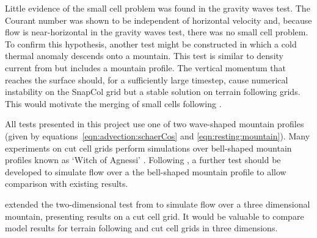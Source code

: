 Little evidence of the small cell problem was found in the gravity waves test.  The Courant number was shown to be independent of horizontal velocity and, because flow is near-horizontal in the gravity waves test, there was no small cell problem.  To confirm this hypothesis, another test might be constructed in which a cold thermal anomaly descends onto a mountain.  This test is similar to density current from \textcite{straka1993} but includes a mountain profile.  The vertical momentum that reaches the surface should, for a sufficiently large timestep, cause numerical instability on the SnapCol grid but a stable solution on terrain following grids.  This would motivate the merging of small cells following \textcite{yamazaki-satomura2010}.

All tests presented in this project use one of two wave-shaped mountain profiles (given by equations~\ref{eqn:advection:schaerCos} and \ref{eqn:resting:mountain}).  Many experiments on cut cell grids perform simulations over bell-shaped mountain profiles known as `Witch of Agnessi' \parencites{steppeler2002}{rosatti2005}{klein2009}{jebens2011}.  Following \textcite{gallus-klemp2000}, a further test should be developed to simulate flow over a the bell-shaped mountain profile to allow comparison with existing results.

\textcite{lock2012} extended the two-dimensional test from \textcite{gallus-klemp2000} to simulate flow over a three dimensional mountain, presenting results on a cut cell grid.  It would be valuable to compare model results for terrain following and cut cell grids in three dimensions.

